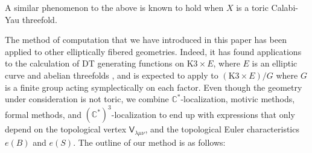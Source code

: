 \documentclass[12pt]{amsart}
\theoremstyle{definition}
\newcommand{\CC} {\mathbb{C}}          %
\newcommand{\sfV}{\mathsf{V}}
\begin{document}
A similar phenomenon to the above is known to hold when $X$ is a toric
Calabi-Yau threefold.


The method of computation that we have introduced in this paper has
been applied to other elliptically fibered geometries. Indeed, it has
found applications to the calculation of DT generating functions on
$\textrm{K3} \times E$, where $E$ is an elliptic curve \cite{Bryan-K3xE} and
abelian threefolds \cite{BOPY}, and is expected to apply to $(\textrm{K3}\times
E)/G$ where $G$ is a finite group acting symplectically on each
factor. Even though the geometry under consideration is not toric, we
combine $\CC^*$-localization, motivic methods, formal methods, and
$(\CC^{*})^{3}$-localization to end up with expressions that only
depend on the topological vertex $\sfV_{\lambda\mu\nu}$, and the
topological Euler characteristics $e(B)$ and $e(S)$. The outline of
our method is as follows:
\end{document}

